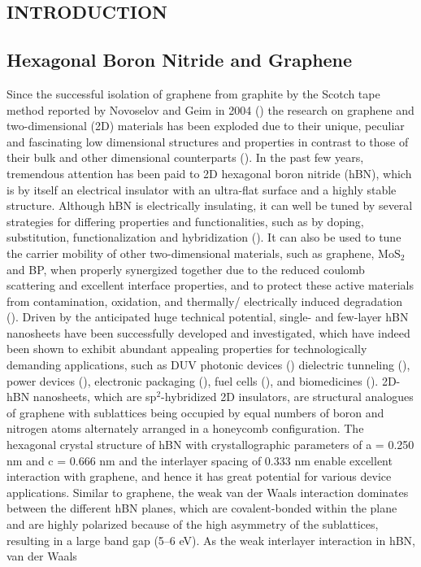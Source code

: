 
\begin{center}
\section{INTRODUCTION}
\end{center}



\subsection{Hexagonal Boron Nitride and Graphene}


Since the successful isolation of graphene from graphite by the Scotch tape method reported by Novoselov and Geim in 2004 (\cite{novoselov2004electric}) the research on graphene and two-dimensional (2D) materials has been exploded due to their unique, peculiar and fascinating low dimensional structures and properties in contrast to those of their bulk and other dimensional counterparts (\cite{xu2013graphene}). In the past few years, tremendous attention has been paid to 2D hexagonal boron nitride (hBN), which is by itself an electrical insulator with an ultra-flat surface and a highly stable structure. Although hBN is electrically insulating, it can well be tuned by several strategies for differing properties and functionalities, such as by doping, substitution, functionalization and hybridization (\cite{zhang2017two}). It can also be used to tune the carrier mobility of other two-dimensional materials, such as graphene, $ \text{MoS}_{2} $ and BP, when properly synergized together due to the reduced coulomb scattering and excellent interface properties, and to protect these active materials from contamination, oxidation, and thermally/ electrically induced degradation (\cite{zhang2017two}). Driven by the anticipated huge technical potential, single- and few-layer hBN nanosheets have been successfully developed and investigated, which have indeed been shown to exhibit abundant appealing properties for technologically demanding applications, such as DUV photonic devices (\cite{jiang2014hexagonal}) dielectric tunneling (\cite{hui2016use}), power devices (\cite{constantinescu2016multipurpose}), electronic packaging (\cite{bao2016two}), fuel cells (\cite{oh2014enhanced}), and biomedicines (\cite{chimene2015two}). 2D-hBN nanosheets, which are s$\text{p}^{2}$-hybridized 2D insulators, are structural analogues of graphene with sublattices being occupied by equal numbers of boron and nitrogen atoms alternately arranged in a honeycomb configuration. The hexagonal crystal structure of hBN with crystallographic parameters of a = 0.250 nm and c = 0.666 nm and the interlayer spacing of 0.333 nm enable excellent interaction with graphene, and hence it has great potential for various device applications. Similar to graphene, the weak van der Waals interaction dominates between the different hBN planes, which are covalent-bonded within the plane and are highly polarized because of the high asymmetry of the sublattices, resulting in a large band gap (5–6 eV). As the weak interlayer interaction in hBN, van der Waals 
